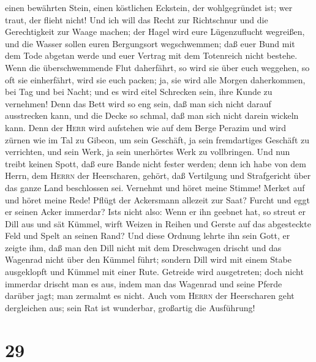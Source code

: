 einen bewährten Stein, einen köstlichen Eckstein, der wohlgegründet ist;
wer traut, der flieht nicht!  Und ich will das Recht zur
Richtschnur und die Gerechtigkeit zur Waage machen; der Hagel wird eure
Lügenzuflucht wegreißen, und die Wasser sollen euren Bergungsort
wegschwemmen;  daß euer Bund mit dem Tode abgetan werde
und euer Vertrag mit dem Totenreich nicht bestehe. Wenn die
überschwemmende Flut daherfährt, so wird sie über euch weggehen,
 so oft sie einherfährt, wird sie euch packen; ja, sie
wird alle Morgen daherkommen, bei Tag und bei Nacht; und es wird eitel
Schrecken sein, ihre Kunde zu vernehmen!  Denn das Bett
wird so eng sein, daß man sich nicht darauf ausstrecken kann, und die
Decke so schmal, daß man sich nicht darein wickeln kann. 
Denn der \textsc{Herr} wird aufstehen wie auf dem Berge Perazim und wird
zürnen wie im Tal zu Gibeon, um sein Geschäft, ja sein fremdartiges
Geschäft zu verrichten, und sein Werk, ja sein unerhörtes Werk zu
vollbringen.  Und nun treibt keinen Spott, daß eure Bande
nicht fester werden; denn ich habe von dem Herrn, dem \textsc{Herrn} der
Heerscharen, gehört, daß Vertilgung und Strafgericht über das ganze Land
beschlossen sei.  Vernehmt und höret meine Stimme! Merket
auf und höret meine Rede!  Pflügt der Ackersmann allezeit
zur Saat? Furcht und eggt er seinen Acker immerdar? 
Ist\textquotesingle s nicht also: Wenn er ihn geebnet hat, so streut er
Dill aus und sät Kümmel, wirft Weizen in Reihen und Gerste auf das
abgesteckte Feld und Spelt an seinen Rand?  Und diese
Ordnung lehrte ihn sein Gott, er zeigte ihm,  daß man den
Dill nicht mit dem Dreschwagen drischt und das Wagenrad nicht über den
Kümmel führt; sondern Dill wird mit einem Stabe ausgeklopft und Kümmel
mit einer Rute.  Getreide wird ausgetreten; doch nicht
immerdar drischt man es aus, indem man das Wagenrad und seine Pferde
darüber jagt; man zermalmt es nicht.  Auch vom
\textsc{Herrn} der Heerscharen geht dergleichen aus; sein Rat ist
wunderbar, großartig die Ausführung!

\hypertarget{section-28}{%
\section{29}\label{section-28}}


